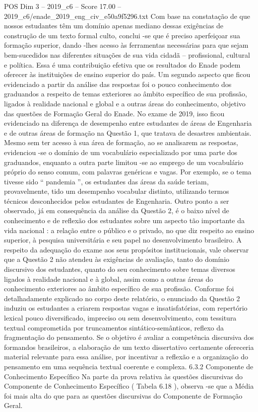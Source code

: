 \begin{textsample}{POS Dim 3 – 2019\_c6 – Score 17.00 – 2019\_c6/enade\_2019\_eng\_civ\_e50a9f5296.txt}
Com base na constatação de que nossos estudantes têm um domínio apenas mediano dessas exigências de construção de um texto formal culto, conclui -se que é preciso aperfeiçoar sua formação superior, dando -lhes acesso às ferramentas necessárias para que sejam bem-sucedidos nas diferentes situações de sua vida cidadã – profissional, cultural e política.
Essa é uma contribuição efetiva que os resultados do Enade podem oferecer às instituições de ensino superior do país.
Um segundo aspecto que ficou evidenciado a partir da análise das respostas foi o pouco conhecimento dos graduandos a respeito de temas exteriores ao âmbito específico de sua profissão, ligados à realidade nacional e global e a outras áreas do conhecimento, objetivo das questões de Formação Geral do Enade.
No exame de 2019, isso ficou evidenciado na diferença de desempenho entre estudantes de áreas de Engenharia e de outras áreas de formação na Questão 1, que tratava de desastres ambientais.
Mesmo sem ter acesso à sua área de formação, ao se analisarem as respostas, evidenciou -se o domínio de um vocabulário especializado por uma parte dos graduandos, enquanto a outra parte limitou -se ao emprego de um vocabulário próprio do senso comum, com palavras genéricas e vagas.
Por exemplo, se o tema tivesse sido “ pandemia ”, os estudantes das áreas da saúde teriam, provavelmente, tido um desempenho vocabular distinto, utilizando termos técnicos desconhecidos pelos estudantes de Engenharia.
Outro ponto a ser observado, já em consequência da análise da Questão 2, é o baixo nível de conhecimento e de reflexão dos estudantes sobre um aspecto tão importante da vida nacional : a relação entre o público e o privado, no que diz respeito ao ensino superior, à pesquisa universitária e seu papel no desenvolvimento brasileiro.
A respeito da adequação do exame aos seus propósitos institucionais, vale observar que a Questão 2 não atendeu às exigências de avaliação, tanto do domínio discursivo dos estudantes, quanto do seu conhecimento sobre temas diversos ligados à realidade nacional e à global, assim como a outras áreas do conhecimento exteriores ao âmbito específico de sua profissão.
Conforme foi detalhadamente explicado no corpo deste relatório, o enunciado da Questão 2 induziu os estudantes a criarem respostas vagas e insatisfatórias, com repertório lexical pouco diversificado, impreciso ou sem desenvolvimento, com tessitura textual comprometida por truncamentos sintático-semânticos, reflexo da fragmentação do pensamento.
Se o objetivo é avaliar a competência discursiva dos formandos brasileiros, a elaboração de um texto dissertativo certamente ofereceria material relevante para essa análise, por incentivar a reflexão e a organização do pensamento em uma sequência textual coerente e complexa. 6.3.2 Componente de Conhecimento Específico Na parte da prova relativa às questões discursivas do Componente de Conhecimento Específico ( Tabela 6.18 ), observa -se que a Média foi mais alta do que para as questões discursivas do Componente de Formação Geral.

\end{textsample}
